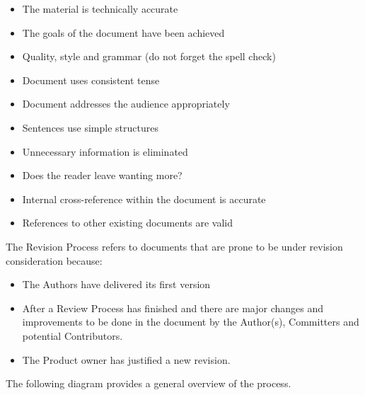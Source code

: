 \documentclass{template/openetcs_article}
\begin{document}
\begin{itemize}
\item The material is technically accurate
\item The goals of the document have been achieved
\item Quality, style and grammar (do not forget the spell check)
\item Document uses consistent tense
\item Document addresses the audience appropriately
\item Sentences use simple structures
\item Unnecessary information is eliminated
\item Does the reader leave wanting more?
\item Internal cross-reference within the document is accurate
\item References to other existing documents are valid
\end{itemize}

The Revision Process refers to documents that are prone to be under revision consideration because:

\begin{itemize}
\item The Authors have delivered its first version
\item After a Review Process has finished and there are major changes and improvements to be done in the document by the Author(s), Committers and potential Contributors. 
\item The Product owner has justified a new revision. 
\end{itemize}

The following diagram provides a general overview of the process. 
\end{document}
